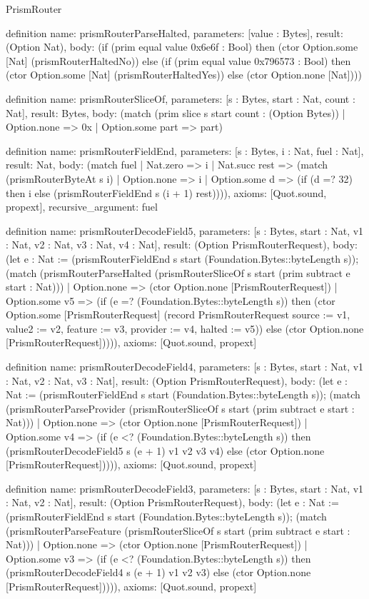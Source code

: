 \begin{lexlean}{PrismRouter}
\begin{semanticmodule}
definition{
  name: prismRouterParseHalted,
  parameters: [value : Bytes],
  result: (Option Nat),
  body: (if (prim equal value 0x6e6f : Bool) then (ctor Option.some [Nat] (prismRouterHaltedNo)) else (if (prim equal value 0x796573 : Bool) then (ctor Option.some [Nat] (prismRouterHaltedYes)) else (ctor Option.none [Nat])))
}

definition{
  name: prismRouterSliceOf,
  parameters: [s : Bytes, start : Nat, count : Nat],
  result: Bytes,
  body: (match (prim slice s start count : (Option Bytes))
    | Option.none => 0x
    | Option.some part => part)
}

definition{
  name: prismRouterFieldEnd,
  parameters: [s : Bytes, i : Nat, fuel : Nat],
  result: Nat,
  body: (match fuel
    | Nat.zero => i
    | Nat.succ rest => (match (prismRouterByteAt s i)
      | Option.none => i
      | Option.some d => (if (d =? 32) then i else (prismRouterFieldEnd s (i + 1) rest)))),
  axioms: [Quot.sound, propext],
  recursive_argument: fuel
}

definition{
  name: prismRouterDecodeField5,
  parameters: [s : Bytes, start : Nat, v1 : Nat, v2 : Nat, v3 : Nat, v4 : Nat],
  result: (Option PrismRouterRequest),
  body: (let e : Nat := (prismRouterFieldEnd s start (Foundation.Bytes::byteLength s)); (match (prismRouterParseHalted (prismRouterSliceOf s start (prim subtract e start : Nat)))
    | Option.none => (ctor Option.none [PrismRouterRequest])
    | Option.some v5 => (if (e =? (Foundation.Bytes::byteLength s)) then (ctor Option.some [PrismRouterRequest] (record PrismRouterRequest {source := v1, value2 := v2, feature := v3, provider := v4, halted := v5})) else (ctor Option.none [PrismRouterRequest])))),
  axioms: [Quot.sound, propext]
}

definition{
  name: prismRouterDecodeField4,
  parameters: [s : Bytes, start : Nat, v1 : Nat, v2 : Nat, v3 : Nat],
  result: (Option PrismRouterRequest),
  body: (let e : Nat := (prismRouterFieldEnd s start (Foundation.Bytes::byteLength s)); (match (prismRouterParseProvider (prismRouterSliceOf s start (prim subtract e start : Nat)))
    | Option.none => (ctor Option.none [PrismRouterRequest])
    | Option.some v4 => (if (e <? (Foundation.Bytes::byteLength s)) then (prismRouterDecodeField5 s (e + 1) v1 v2 v3 v4) else (ctor Option.none [PrismRouterRequest])))),
  axioms: [Quot.sound, propext]
}

definition{
  name: prismRouterDecodeField3,
  parameters: [s : Bytes, start : Nat, v1 : Nat, v2 : Nat],
  result: (Option PrismRouterRequest),
  body: (let e : Nat := (prismRouterFieldEnd s start (Foundation.Bytes::byteLength s)); (match (prismRouterParseFeature (prismRouterSliceOf s start (prim subtract e start : Nat)))
    | Option.none => (ctor Option.none [PrismRouterRequest])
    | Option.some v3 => (if (e <? (Foundation.Bytes::byteLength s)) then (prismRouterDecodeField4 s (e + 1) v1 v2 v3) else (ctor Option.none [PrismRouterRequest])))),
  axioms: [Quot.sound, propext]
}


\end{semanticmodule}
\end{lexlean}
